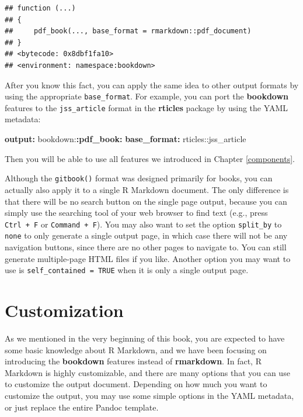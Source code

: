 \documentclass[
  12pt,
]{krantz}
\newenvironment{Shaded}{\begin{snugshade}}{\end{snugshade}}
\newcommand{\AttributeTok}[1]{\textcolor[rgb]{0.13,0.29,0.53}{#1}}
\newcommand{\FunctionTok}[1]{\textcolor[rgb]{0.13,0.29,0.53}{\textbf{#1}}}
\newcommand{\KeywordTok}[1]{\textcolor[rgb]{0.13,0.29,0.53}{\textbf{#1}}}
\newcounter{none} %
\theoremstyle{definition}
\theoremstyle{definition}
\theoremstyle{definition}
\theoremstyle{definition}
\theoremstyle{remark}
\begin{document}
\begin{verbatim}
## function (...) 
## {
##     pdf_book(..., base_format = rmarkdown::pdf_document)
## }
## <bytecode: 0x8dbf1fa10>
## <environment: namespace:bookdown>
\end{verbatim}

After you know this fact, you can apply the same idea to other output formats by using the appropriate \texttt{base\_format}. For example, you can port the \textbf{bookdown} features to the \texttt{jss\_article} format in the \textbf{rticles} package \citep{R-rticles} by using the YAML metadata:

\begin{Shaded}
\begin{Highlighting}[]
\FunctionTok{output}\KeywordTok{:}
\AttributeTok{  bookdown:}\FunctionTok{:pdf\_book}\KeywordTok{:}
\AttributeTok{    }\FunctionTok{base\_format}\KeywordTok{:}\AttributeTok{ rticles::jss\_article}
\end{Highlighting}
\end{Shaded}

Then you will be able to use all features we introduced in Chapter \ref{components}.

Although the \texttt{gitbook()} format was designed primarily for books, you can actually also apply it to a single R Markdown document. The only difference is that there will be no search button on the single page output, because you can simply use the searching tool of your web browser to find text (e.g., press \texttt{Ctrl\ +\ F} or \texttt{Command\ +\ F}). You may also want to set the option \texttt{split\_by} to \texttt{none} to only generate a single output page, in which case there will not be any navigation buttons, since there are no other pages to navigate to. You can still generate multiple-page HTML files if you like. Another option you may want to use is \texttt{self\_contained\ =\ TRUE} when it is only a single output page.

\chapter{Customization}\label{customization}

As we mentioned in the very beginning of this book, you are expected to have some basic knowledge about R Markdown, and we have been focusing on introducing the \textbf{bookdown} features instead of \textbf{rmarkdown}. In fact, R Markdown is highly customizable, and there are many options that you can use to customize the output document. Depending on how much you want to customize the output, you may use some simple options in the YAML metadata, or just replace the entire Pandoc template.
\end{document}
